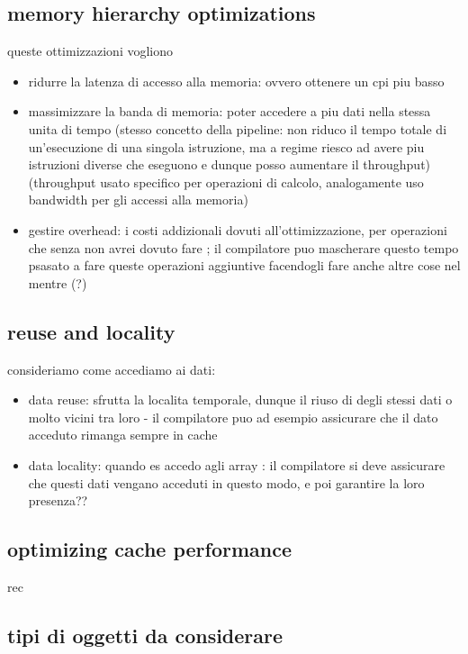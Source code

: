 \subsection{memory hierarchy optimizations}

queste ottimizzazioni vogliono
\begin{itemize}
  \item ridurre la latenza di accesso alla memoria: ovvero ottenere un cpi piu basso
  \item massimizzare la banda di memoria: poter accedere a piu dati nella stessa unita di tempo (stesso concetto della pipeline: non riduco il tempo totale di un'esecuzione di una singola istruzione, ma a regime riesco ad avere piu istruzioni diverse che eseguono e dunque posso aumentare il throughput) (throughput usato specifico per operazioni di calcolo, analogamente uso bandwidth per gli accessi alla memoria)
  \item gestire overhead: i costi addizionali dovuti all'ottimizzazione, per operazioni che senza non avrei dovuto fare ; il compilatore puo mascherare questo tempo psasato a fare queste operazioni aggiuntive facendogli fare anche altre cose nel mentre (?)
\end{itemize}

\subsection{reuse and locality}

consideriamo come accediamo ai dati:
\begin{itemize}
  \item data reuse: sfrutta la localita temporale, dunque il riuso di degli stessi dati o molto vicini tra loro - il compilatore puo ad esempio assicurare che il dato acceduto rimanga sempre in cache
  \item data locality: quando es accedo agli array : il compilatore si deve assicurare che questi dati vengano acceduti in questo modo, e poi garantire la loro presenza??
\end{itemize}

\subsection{optimizing cache performance}

rec

\subsection{tipi di oggetti da considerare}

